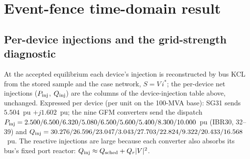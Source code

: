 \documentclass[12pt,a4paper]{article}
\begin{document}
\section{Event-fence time-domain result}\label{sec:transient}

\subsection{Per-device injections and the grid-strength diagnostic}

At the accepted equilibrium each device's injection is reconstructed by bus
KCL from the stored sample and the case network, $S=V\,i^*$; the per-device
net injections ($P_{\rm inj}$, $Q_{\rm inj}$) are the columns of the
device-injection table above, unchanged.  Expressed per device (per unit on
the 100-MVA base):
SG31 sends $5.504$~pu $+j1.602$~pu; the nine GFM converters send the
dispatch $P_{\rm inj}=2.500/6.500/6.320/5.080/6.500/5.600/5.400/8.300/10.000$~pu
(IBR30, 32--39) and $Q_{\rm inj}=30.276/26.596/23.047/3.043/27.703/
22.824/9.322/20.433/16.568$~pu.  The reactive injections are large because
each converter also absorbs its bus's fixed port reactor:
$Q_{\rm inj}\approx Q_{\rm sched}+Q_r|V|^2$.
\end{document}
